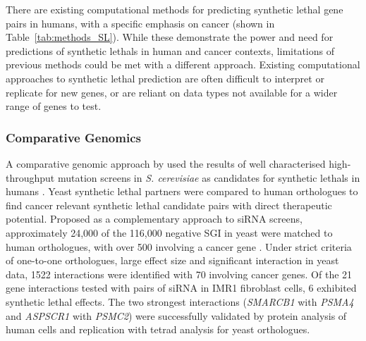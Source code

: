 There are existing computational methods for predicting \gls{synthetic lethal} gene pairs in humans, with a specific emphasis on cancer (shown in Table~\ref{tab:methods_SL}). While these demonstrate the power and need for predictions of \glspl{synthetic lethal} in human and cancer contexts, limitations of previous methods could be met with a different approach. Existing computational approaches to \gls{synthetic lethal} prediction are often difficult to interpret or replicate for new genes, or are reliant on data types not available for a wider range of genes to test.  

\subsubsection{Comparative Genomics}

A comparative \gls{genomic} approach by \citet{Deshpande2013} used the results of well characterised high-throughput \gls{mutation} screens in \textit{S. cerevisiae} as candidates for \glspl{synthetic lethal} in humans \citep{Baryshnikova2010a, Costanzo2010, Costanzo2011, Tong2001, Tong2004}. Yeast \gls{synthetic lethal} partners were compared to human orthologues to find cancer relevant \gls{synthetic lethal} candidate pairs with direct therapeutic potential. Proposed as a complementary approach to \gls{siRNA} screens, approximately 24,000 of the 116,000 negative \gls{SGI} in yeast \citep{Costanzo2011} were matched to human orthologues, with over 500 involving a \gls{cancer gene} \citep{Futreal2004}. Under strict criteria of one-to-one orthologues, large effect size %
and significant interaction %
in yeast data, 1522 interactions were identified with 70 involving \glspl{cancer gene}. Of the 21 gene interactions tested with pairs of \gls{siRNA} in IMR1 fibroblast cells, 6 exhibited \gls{synthetic lethal} effects. The two strongest interactions (\textit{SMARCB1} with \textit{PSMA4} and \textit{ASPSCR1} with \textit{PSMC2}) were successfully validated by protein analysis of human cells and replication with tetrad analysis for yeast orthologues.

